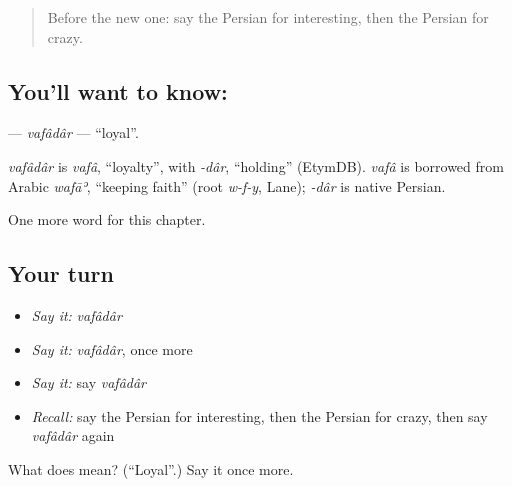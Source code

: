 \label{lesson:FA-C236-vafadar}



\begin{quote}
Before the new one: say the Persian for interesting, then the Persian for crazy.
\end{quote}

\subsection*{You'll want to know: }
\textbf{} — \emph{vafâdâr} — \textquotedblleft{}loyal\textquotedblright{}.

\begin{cousinweb}
\emph{vafâdâr} is \emph{vafâ}, \textquotedblleft{}loyalty\textquotedblright{}, with \emph{-dâr}, \textquotedblleft{}holding\textquotedblright{} (EtymDB). \emph{vafâ} is borrowed from Arabic \emph{wafāʾ}, \textquotedblleft{}keeping faith\textquotedblright{} (root \emph{w-f-y}, Lane); \emph{-dâr} is native Persian.
\end{cousinweb}

\begin{grammarlens}[title={What you've built}]
One more word for this chapter.
\end{grammarlens}

\subsection*{Your turn}
\begin{itemize}
\raggedright
  \item \emph{Say it:} \emph{vafâdâr}
  \item \emph{Say it:} \emph{vafâdâr}, once more
  \item \emph{Say it:} say \emph{vafâdâr}
  \item \emph{Recall:} say the Persian for interesting, then the Persian for crazy, then say \emph{vafâdâr} again
\end{itemize}

\begin{tcolorbox}[breakable,colback=teal!4,colframe=teal!35!black,title={Before you move on}]
What does  mean? (\textquotedblleft{}Loyal\textquotedblright{}.) Say it once more.
\end{tcolorbox}
